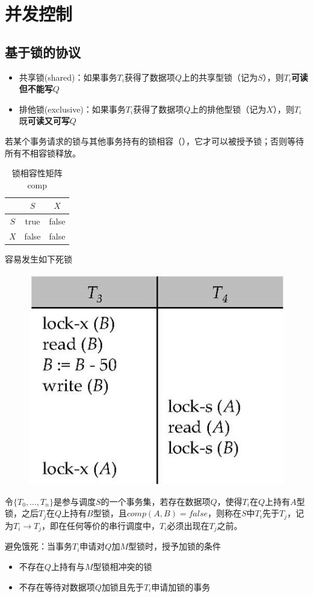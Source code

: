 
\section{并发控制} %
\subsection{基于锁的协议}
\begin{itemize}
	\item 共享锁(shared)：如果事务$T_i$获得了数据项$Q$上的共享型锁（记为$S$），则$T_i$\textbf{可读但不能写}$Q$
	\item 排他锁(exclusive)：如果事务$T_i$获得了数据项$Q$上的排他型锁（记为$X$），则$T_i$既\textbf{可读又可写}$Q$
\end{itemize}

若某个事务请求的锁与其他事务持有的锁相容（），它才可以被授予锁；否则等待所有不相容锁释放。
\begin{table}
\centering
\caption{锁相容性矩阵comp}
\begin{tabular}{|c|c|c|}\hline
 & $S$ & $X$\\\hline
$S$ & true & false\\\hline
$X$ & false & false\\\hline
\end{tabular}
\end{table}

容易发生如下死锁
\begin{figure}[H]
\centering
\includegraphics[width=0.3\linewidth]{fig/deadlock.jpg}
\end{figure}

令$\{T_0,\ldots,T_n\}$是参与调度$S$的一个事务集，若存在数据项$Q$，使得$T_i$在$Q$上持有$A$型锁，之后$T_j$在$Q$上持有$B$型锁，且$comp(A,B)=false$，则称在$S$中$T_i$先于$T_j$，记为$T_i\to T_j$，即在任何等价的串行调度中，$T_i$必须出现在$T_j$之前。

避免饿死：当事务$T_i$申请对$Q$加$M$型锁时，授予加锁的条件
\begin{itemize}
	\item 不存在$Q$上持有与$M$型锁相冲突的锁
	\item 不存在等待对数据项$Q$加锁且先于$T_i$申请加锁的事务
\end{itemize}

